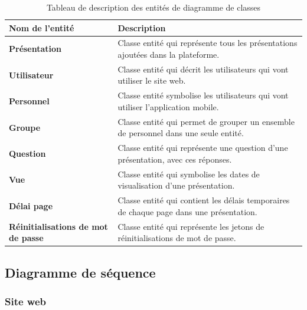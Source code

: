 \documentclass[12pt, ChapStyle1, oneside]{./Styles/Dea_Gsm}
\begin{document}
\begin{table}[H]
{\renewcommand{\arraystretch}{3}%
\begin{tabular}{ | p{4cm} | p{10cm} | }
 \hline
 \textbf{Nom de l'entité} & Description \\
 \hline
 \textbf{Présentation}
 &  Classe entité qui représente tous les présentations ajoutées dans la plateforme.\\
  \hline
 \textbf{Utilisateur}
 & Classe entité qui décrit les utilisateurs qui vont utiliser le site web.\\
\hline
 \textbf{Personnel}
 & Classe entité symbolise les utilisateurs qui vont utiliser l’application mobile.\\
\hline
 \textbf{Groupe}
 & Classe entité qui permet de grouper un ensemble de personnel dans une seule entité.\\
\hline
 \textbf{Question}
 & Classe entité qui représente une question d’une présentation, avec ces réponses.\\
\hline
 \textbf{Vue}
 & Classe entité qui symbolise les dates de visualisation d’une présentation.\\
\hline
 \textbf{Délai page}
 & Classe entité qui contient les délais temporaires de chaque page dans une présentation.\\
\hline
 \textbf{Réinitialisations de mot de passe}
 & Classe entité qui représente les jetons de réinitialisations de mot de passe.\\
\hline
\end{tabular}} \quad
\caption{Tableau de description des entités de diagramme de classes}
\label{table:1}
\end{table}

\vspace{15mm}


\subsection{Diagramme de séquence}
\subsubsection{Site web}
\end{document}
